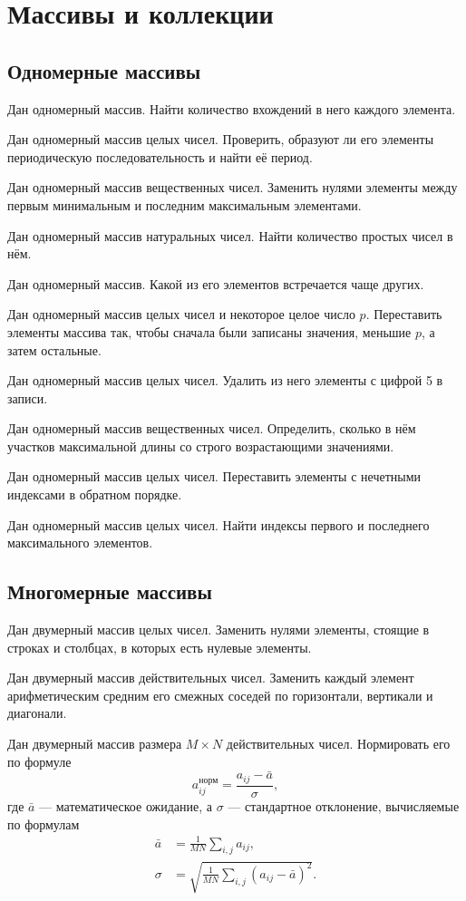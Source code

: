 \section{Массивы и коллекции}


\subsection{Одномерные массивы}

\task* Дан одномерный массив. Найти количество вхождений в него каждого
элемента.

\task Дан одномерный массив целых чисел. Проверить, образуют ли его
элементы периодическую последовательность и найти её период.

\task Дан одномерный массив вещественных чисел. Заменить нулями
элементы между первым минимальным и последним максимальным элементами.

\task Дан одномерный массив натуральных чисел. Найти количество
простых чисел в нём.

\task* Дан одномерный массив. Какой из его элементов встречается чаще
других.

\task Дан одномерный массив целых чисел и некоторое целое число
$p$. Переставить элементы массива так, чтобы сначала были записаны
значения, меньшие $p$, а затем остальные.

\task* Дан одномерный массив целых чисел. Удалить из него элементы с
цифрой 5 в записи.

\task Дан одномерный массив вещественных чисел. Определить, сколько в
нём участков максимальной длины со строго возрастающими значениями.

\task Дан одномерный массив целых чисел. Переставить элементы с
нечетными индексами в обратном порядке.

\task* Дан одномерный массив целых чисел. Найти индексы первого и
последнего максимального элементов.

\subsection{Многомерные массивы}

\task Дан двумерный массив целых чисел. Заменить нулями элементы,
стоящие в строках и столбцах, в которых есть нулевые элементы.

\task Дан двумерный массив действительных чисел. Заменить каждый элемент
арифметическим средним его смежных соседей по горизонтали, вертикали и
диагонали.

\task Дан двумерный массив размера $M\times N$ действительных
чисел. Нормировать его по формуле
\[
a_{ij}^\textrm{норм} = \frac{a_{ij}-\bar{a}}{\sigma},
\]
где $\bar{a}$ — математическое ожидание, а $\sigma$ — стандартное
отклонение, вычисляемые по формулам
\begin{align*}
  \bar{a} &= \frac{1}{MN}\sum_{i,j}a_{ij},\\
  \sigma  &= \sqrt{\frac{1}{MN}\sum_{i,j}(a_{ij}-\bar{a})^2}. 
\end{align*}

